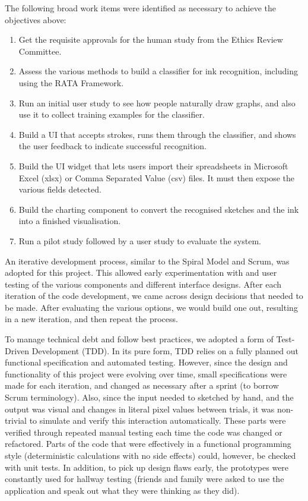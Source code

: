 	The following broad work items were identified as necessary to achieve the objectives above:
	\begin{enumerate}
		\item Get the requisite approvals for the human study from the Ethics Review Committee.
		\item Assess the various methods to build a classifier for ink recognition, including using the RATA Framework.
		\item Run an initial user study to  see how people naturally draw graphs, and also use it to collect training examples for the classifier.
		\item Build a UI that accepts strokes, runs them through the classifier, and shows the user feedback to indicate successful recognition.
		\item Build the UI widget that lets users import their spreadsheets in Microsoft Excel (xlsx) or Comma Separated Value (csv) files. It must then expose the various fields detected.
		\item Build the charting component to convert the recognised sketches and the ink into a finished visualisation.
		\item Run a pilot study followed by a user study to evaluate the system.
	\end{enumerate}	
	
	An iterative development process, similar to the Spiral Model and Scrum, was adopted for this project. This allowed early experimentation with and user testing of the various components and different interface designs. After each iteration of the code development, we came across design decisions that needed to be made. After evaluating the various options, we would build one out, resulting in a new iteration, and then repeat the process.
	
	To manage technical debt and follow best practices, we adopted a form of Test-Driven Development (TDD). In its pure form, TDD relies on a fully planned out functional specification and automated testing. However, since the design and functionality of this project were evolving over time, small specifications were made for each iteration, and changed as necessary after a sprint (to borrow Scrum terminology). Also, since the input needed to sketched by hand, and the output was visual and changes in literal pixel values between trials, it was non-trivial to simulate and verify this interaction automatically. These parts were verified through repeated manual testing each time the code was changed or refactored. Parts of the code that were effectively in a functional programming style (deterministic calculations with no side effects) could, however, be checked with unit tests. In addition, to pick up design flaws early, the prototypes were constantly used for hallway testing (friends and family were asked to use the application and speak out what they were thinking as they did).
	

